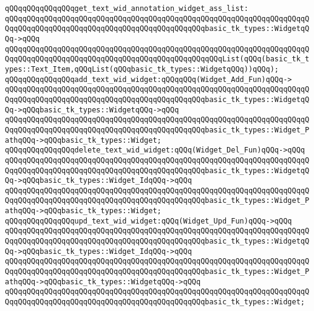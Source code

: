 \newline
\verb|qQQqqQQqqQQqqQQqget_text_wid_annotation_widget_ass_list:|\newline
\verb|qQQqqQQqqQQqqQQqqQQqqQQqqQQqqQQqqQQqqQQqqQQqqQQqqQQqqQQqqQQqqQQqqQQqqQQqqQQqqQQqqQQqqQQqqQQqqQQqqQQqqQQqqQQqqQQqqQQqbasic_tk_types::WidgetqQQq->qQQq|\newline
\verb|qQQqqQQqqQQqqQQqqQQqqQQqqQQqqQQqqQQqqQQqqQQqqQQqqQQqqQQqqQQqqQQqqQQqqQQqqQQqqQQqqQQqqQQqqQQqqQQqqQQqqQQqqQQqqQQqqQQqqQQqList(qQQq(basic_tk_types::Text_Item,qQQqList(qQQqbasic_tk_types::WidgetqQQq))qQQq);|\newline
\newline
\verb|qQQqqQQqqQQqqQQqadd_text_wid_widget:qQQqqQQq(Widget_Add_Fun)qQQq->|\newline
\verb|qQQqqQQqqQQqqQQqqQQqqQQqqQQqqQQqqQQqqQQqqQQqqQQqqQQqqQQqqQQqqQQqqQQqqQQqqQQqqQQqqQQqqQQqqQQqqQQqqQQqqQQqqQQqqQQqqQQqbasic_tk_types::WidgetqQQq->qQQqbasic_tk_types::WidgetqQQq->qQQq|\newline
\verb|qQQqqQQqqQQqqQQqqQQqqQQqqQQqqQQqqQQqqQQqqQQqqQQqqQQqqQQqqQQqqQQqqQQqqQQqqQQqqQQqqQQqqQQqqQQqqQQqqQQqqQQqqQQqqQQqqQQqbasic_tk_types::Widget_PathqQQq->qQQqbasic_tk_types::Widget;|\newline
\newline
\verb|qQQqqQQqqQQqqQQqdelete_text_wid_widget:qQQq(Widget_Del_Fun)qQQq->qQQq|\newline
\verb|qQQqqQQqqQQqqQQqqQQqqQQqqQQqqQQqqQQqqQQqqQQqqQQqqQQqqQQqqQQqqQQqqQQqqQQqqQQqqQQqqQQqqQQqqQQqqQQqqQQqqQQqqQQqqQQqqQQqbasic_tk_types::WidgetqQQq->qQQqbasic_tk_types::Widget_IdqQQq->qQQq|\newline
\verb|qQQqqQQqqQQqqQQqqQQqqQQqqQQqqQQqqQQqqQQqqQQqqQQqqQQqqQQqqQQqqQQqqQQqqQQqqQQqqQQqqQQqqQQqqQQqqQQqqQQqqQQqqQQqqQQqqQQqbasic_tk_types::Widget_PathqQQq->qQQqbasic_tk_types::Widget;|\newline
\verb|qQQqqQQqqQQqqQQqupd_text_wid_widget:qQQq(Widget_Upd_Fun)qQQq->qQQq|\newline
\verb|qQQqqQQqqQQqqQQqqQQqqQQqqQQqqQQqqQQqqQQqqQQqqQQqqQQqqQQqqQQqqQQqqQQqqQQqqQQqqQQqqQQqqQQqqQQqqQQqqQQqqQQqqQQqqQQqqQQqbasic_tk_types::WidgetqQQq->qQQqbasic_tk_types::Widget_IdqQQq->qQQq|\newline
\verb|qQQqqQQqqQQqqQQqqQQqqQQqqQQqqQQqqQQqqQQqqQQqqQQqqQQqqQQqqQQqqQQqqQQqqQQqqQQqqQQqqQQqqQQqqQQqqQQqqQQqqQQqqQQqqQQqqQQqbasic_tk_types::Widget_PathqQQq->qQQqbasic_tk_types::WidgetqQQq->qQQq|\newline
\verb|qQQqqQQqqQQqqQQqqQQqqQQqqQQqqQQqqQQqqQQqqQQqqQQqqQQqqQQqqQQqqQQqqQQqqQQqqQQqqQQqqQQqqQQqqQQqqQQqqQQqqQQqqQQqqQQqqQQqbasic_tk_types::Widget;|\newline

